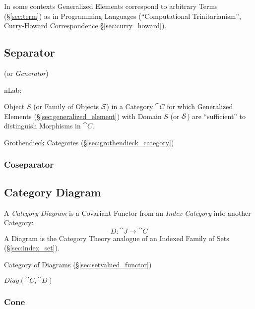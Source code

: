 In some contexts Generalized Elements correspond to arbitrary Terms
(\S\ref{sec:term}) as in Programming Languages (``Computational
Trinitarianism'', Curry-Howard Correspondence
\S\ref{sec:curry_howard}).



\subsection{Separator}\label{sec:separator}

(or \emph{Generator})

nLab:

Object $S$ (or Family of Objects $\mathcal{S}$) in a Category $\cat{C}$
for which Generalized Elements (\S\ref{sec:generalized_element}) with
Domain $S$ (or $\mathcal{S}$) are ``sufficient'' to distinguish
Morphisms in $\cat{C}$.

Grothendieck Categories (\S\ref{sec:grothendieck_category})



\subsubsection{Coseparator}\label{sec:coseparator}



\subsection{Category Diagram}\label{sec:category_diagram}

A \emph{Category Diagram} is a Covariant Functor from an \emph{Index
  Category} into another Category:
\[
  D : \cat{J} \rightarrow \cat{C}
\]
A Diagram is the Category Theory analogue of an Indexed Family of Sets
(\S\ref{sec:index_set}).

Category of Diagrams (\S\ref{sec:setvalued_functor})

$Diag(\cat{C},\cat{D})$



\subsubsection{Cone}\label{sec:category_cone}


